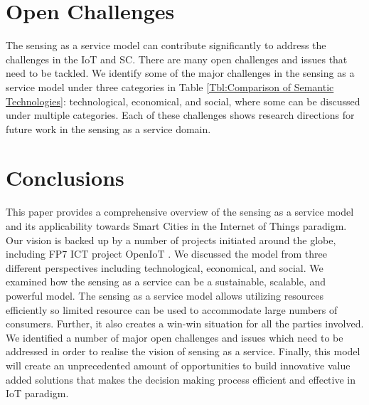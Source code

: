 \documentclass[times]{ettauth}
\begin{document}
\begin{table*}[t]
\begin{tabular}{ m{0.05cm} m{2.0cm} m{12cm}  }
\\ \hline


\end{tabular}

\label{Tbl:Comparison of Semantic Technologies}
\vspace{-0.6cm}
\end{table*}





\section{Open Challenges}
\label{sec:Challenges}

The sensing as a service model can contribute significantly to address the challenges in the IoT and SC. There are many open challenges and issues that need to be tackled. We identify some of the major challenges in the sensing as a service model under three categories in Table \ref{Tbl:Comparison of Semantic Technologies}: technological, economical, and social, where some can be discussed under multiple categories. Each of these challenges shows research directions for future work in the sensing as a service domain.











\section{Conclusions}
\label{sec:Conclusions}

This paper provides a comprehensive overview of the sensing as a service model and its applicability towards Smart Cities in the Internet of Things paradigm. Our vision is backed up by a number of projects initiated around the globe, including FP7 ICT project OpenIoT \cite{P377}. We discussed the model from three different perspectives including technological, economical, and social. We examined how the sensing as a service can be a sustainable, scalable, and powerful model. The sensing as a service model allows utilizing  resources efficiently so limited resource can be used to accommodate large numbers of consumers. Further, it also creates a win-win situation for all the parties involved. We identified a number of major open challenges and issues which need to be addressed in order to realise the vision of sensing as a service. Finally, this model will create an unprecedented amount of opportunities to build innovative value added solutions that makes the decision making process efficient and effective in IoT paradigm.
\end{document}
